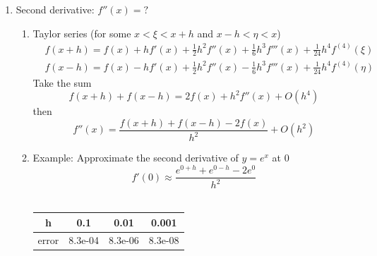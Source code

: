 \documentclass{article}
\theoremstyle{remark}
\begin{document}
\begin{enumerate}
\item Second derivative: $f''(x) = ?$
\begin{enumerate}
\item Taylor series (for some $x<\xi<x+h$ and $x-h<\eta<x$)
\begin{equation*}
\begin{split}
& f(x+h) = f(x) + hf'(x) + \frac{1}{2}h^2f''(x)+ \frac{1}{6}h^3f'''(x)+ \frac{1}{24}h^4f^{(4)}(\xi)\\
& f(x-h) = f(x) - hf'(x) + \frac{1}{2}h^2f''(x)- \frac{1}{6}h^3f'''(x)+ \frac{1}{24}h^4f^{(4)}(\eta)
\end{split}
\end{equation*}
Take the sum
$$
f(x+h) + f(x-h) = 2f(x) + h^2f''(x) + O(h^4)
$$
then
$$
f''(x) = \frac{f(x+h)+f(x-h)-2f(x)}{h^2}+ O(h^2)
$$

\item Example: Approximate the second derivative of $y = e^x$ at $0$
$$
f'(0) \approx \frac{e^{0+h}+e^{0-h}-2e^0}{h^2}
$$\\
\begin{center}
\begin{tabular}{|c|c|c|c|}
\hline
h & 0.1 & 0.01& 0.001\\\hline
error & 8.3e-04 & 8.3e-06 & 8.3e-08\\\hline
\end{tabular}
\end{center}
\end{enumerate}


\end{enumerate}
\end{document}
